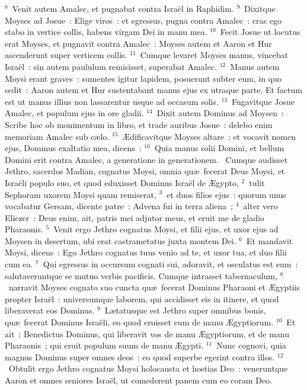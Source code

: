 ${}^{8}$~Venit autem Amalec, et pugnabat contra Isra\"el in Raphidim.
${}^{9}$~Dixitque Moyses ad Josue~: Elige viros~: et egressus, pugna contra Amalec~: cras ego stabo in vertice collis, habens virgam Dei in manu mea.
${}^{10}$~Fecit Josue ut locutus erat Moyses, et pugnavit contra Amalec~: Moyses autem et Aaron et Hur ascenderunt super verticem collis.
${}^{11}$~Cumque levaret Moyses manus, vincebat Isra\"el~: sin autem paululum remisisset, superabat Amalec.
${}^{12}$~Manus autem Moysi erant graves~: sumentes igitur lapidem, posuerunt subter eum, in quo sedit~: Aaron autem et Hur sustentabant manus ejus ex utraque parte. Et factum est ut manus illius non lassarentur usque ad occasum solis.
${}^{13}$~Fugavitque Josue Amalec, et populum ejus in ore gladii.
${}^{14}$~Dixit autem Dominus ad Moysen~: Scribe hoc ob monimentum in libro, et trade auribus Josue~: delebo enim memoriam Amalec sub c\ae lo.
${}^{15}$~\AE dificavitque Moyses altare~: et vocavit nomen ejus, Dominus exaltatio mea, dicens~:
${}^{16}$~Quia manus solii Domini, et bellum Domini erit contra Amalec, a generatione in generationem.
~\lettrine[lines=10,image=true,loversize=0.05,lraise=-0.03]{C}{}umque audisset Jethro, sacerdos Madian, cognatus Moysi, omnia qu\ae\ fecerat Deus Moysi, et Isra\"eli populo suo, et quod eduxisset Dominus Isra\"el de \AE gypto,
${}^{2}$~tulit Sephoram uxorem Moysi quam remiserat,
${}^{3}$~et duos filios ejus~: quorum unus vocabatur Gersam, dicente patre~: Advena fui in terra aliena~;
${}^{4}$~alter vero Eliezer~: Deus enim, ait, patris mei adjutor meus, et eruit me de gladio Pharaonis.
${}^{5}$~Venit ergo Jethro cognatus Moysi, et filii ejus, et uxor ejus ad Moysen in desertum, ubi erat castrametatus juxta montem Dei.
${}^{6}$~Et mandavit Moysi, dicens~: Ego Jethro cognatus tuus venio ad te, et uxor tua, et duo filii cum ea.
${}^{7}$~Qui egressus in occursum cognati sui, adoravit, et osculatus est eum~: salutaveruntque se mutuo verbis pacificis. Cumque intrasset tabernaculum,
${}^{8}$~narravit Moyses cognato suo cuncta qu\ae\ fecerat Dominus Pharaoni et \AE gyptiis propter Isra\"el~: universumque laborem, qui accidisset eis in itinere, et quod liberaverat eos Dominus.
${}^{9}$~L\ae tatusque est Jethro super omnibus bonis, qu\ae\ fecerat Dominus Isra\"eli, eo quod eruisset eum de manu \AE gyptiorum.
${}^{10}$~Et ait~: Benedictus Dominus, qui liberavit vos de manu \AE gyptiorum, et de manu Pharaonis~; qui eruit populum suum de manu \AE gypti.
${}^{11}$~Nunc cognovi, quia magnus Dominus super omnes deos~: eo quod superbe egerint contra illos.
${}^{12}$~Obtulit ergo Jethro cognatus Moysi holocausta et hostias Deo~: veneruntque Aaron et omnes seniores Isra\"el, ut comederent panem cum eo coram Deo.


